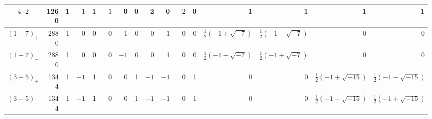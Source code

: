 \documentclass[11pt]{article}
\begin{document}
\begin{landscape}
\begin{center}
\begin{tabular}{c r|rrrrrrrrrrrrrr}
$4\cdot2$ & 1260 & 1 & $-1$ & 1 & $-1$ & 0 & 0 & 2 & 0 & $-2$ & 0 & 1 & 1 & 1 & 1\\
\midrule
$(1+7)_{+}$ & 2880 & 1 & 0 & 0 & 0 & $-1$ & 0 & 0 & 1 & 0 & 0 & $\frac12(-1+\sqrt{-7})$ & $\frac12(-1-\sqrt{-7})$ & 0 & 0\\
$(1+7)_{-}$ & 2880 & 1 & 0 & 0 & 0 & $-1$ & 0 & 0 & 1 & 0 & 0 & $\frac12(-1-\sqrt{-7})$ & $\frac12(-1+\sqrt{-7})$ & 0 & 0\\
$(3+5)_{+}$ & 1344 & 1 & $-1$ & 1 & 0 & 0 & 1 & $-1$ & $-1$ & 0 & 1 & 0 & 0 & $\frac12(-1+\sqrt{-15})$ & $\frac12(-1-\sqrt{-15})$\\
$(3+5)_{-}$ & 1344 & 1 & $-1$ & 1 & 0 & 0 & 1 & $-1$ & $-1$ & 0 & 1 & 0 & 0 & $\frac12(-1-\sqrt{-15})$ & $\frac12(-1+\sqrt{-15})$\\
\bottomrule
\end{tabular}
\end{center}
\end{landscape}
\end{document}
